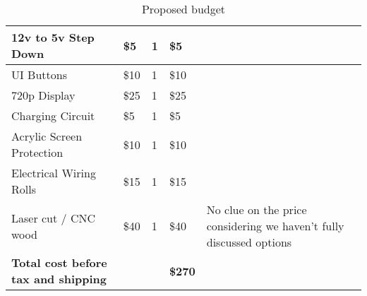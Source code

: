 \begin{table}[h!]
\begin{tabular}{|l|l|l|l|l|}
    12v to 5v Step Down                           & \$5             & 1                   & \$5              &                                                                       \\ \hline
    UI Buttons                                    & \$10            & 1                   & \$10             &                                                                       \\ \hline
    720p Display                                  & \$25            & 1                   & \$25             &                                                                       \\ \hline
    Charging Circuit                              & \$5             & 1                   & \$5              &                                                                       \\ \hline
    Acrylic Screen Protection                     & \$10            & 1                   & \$10             &                                                                       \\ \hline
    Electrical Wiring Rolls                       & \$15            & 1                   & \$15             &                                                                       \\ \hline
    Laser cut / CNC wood                          & \$40            & 1                   & \$40             & No clue on the price considering we haven't fully discussed options   \\ \hline
    \textbf{Total cost before tax and shipping }  &                 &                     & \textbf{\$270 }  &                                                                       \\ \hline
  \end{tabular}
  \caption{Proposed budget}
  \label{Tab:budget}
\end{table}
